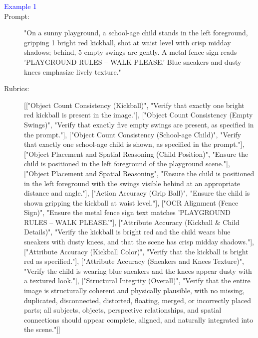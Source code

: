 \begin{tcolorbox}[
  breakable,
  enhanced,
  colback=white,
  colframe=black!70,
  boxrule=0.8pt,
  arc=2pt,
  title={Prompt-rubric Examples},
  colbacktitle=black!75,
  coltitle=white,
  fonttitle=\bfseries,
  left=8pt,right=8pt,top=8pt,bottom=8pt
]
\footnotesize
\begin{description}
\item[\textcolor{blue}{Example 1}]
\item[Prompt:] "On a sunny playground, a school-age child stands in the left foreground, gripping 1 bright red kickball, shot at waist level with crisp midday shadows; behind, 5 empty swings arc gently. A metal fence sign reads 'PLAYGROUND RULES – WALK PLEASE.' Blue sneakers and dusty knees emphasize lively texture."
\item[Rubrics:] [["Object Count Consistency (Kickball)", "Verify that exactly one bright red kickball is present in the image."], ["Object Count Consistency (Empty Swings)", "Verify that exactly five empty swings are present, as specified in the prompt."], ["Object Count Consistency (School-age Child)", "Verify that exactly one school-age child is shown, as specified in the prompt."], ["Object Placement and Spatial Reasoning (Child Position)", "Ensure the child is positioned in the left foreground of the playground scene."], ["Object Placement and Spatial Reasoning", "Ensure the child is positioned in the left foreground with the swings visible behind at an appropriate distance and angle."], ["Action Accuracy (Grip Ball)", "Ensure the child is shown gripping the kickball at waist level."], ["OCR Alignment (Fence Sign)", "Ensure the metal fence sign text matches 'PLAYGROUND RULES – WALK PLEASE.'"], ["Attribute Accuracy (Kickball \& Child Details)", "Verify the kickball is bright red and the child wears blue sneakers with dusty knees, and that the scene has crisp midday shadows."], ["Attribute Accuracy (Kickball Color)", "Verify that the kickball is bright red as specified."], ["Attribute Accuracy (Sneakers and Knees Texture)", "Verify the child is wearing blue sneakers and the knees appear dusty with a textured look."], ["Structural Integrity (Overall)", "Verify that the entire image is structurally coherent and physically plausible, with no missing, duplicated, disconnected, distorted, floating, merged, or incorrectly placed parts; all subjects, objects, perspective relationships, and spatial connections should appear complete, aligned, and naturally integrated into the scene."]]


\end{description}
\end{tcolorbox}
